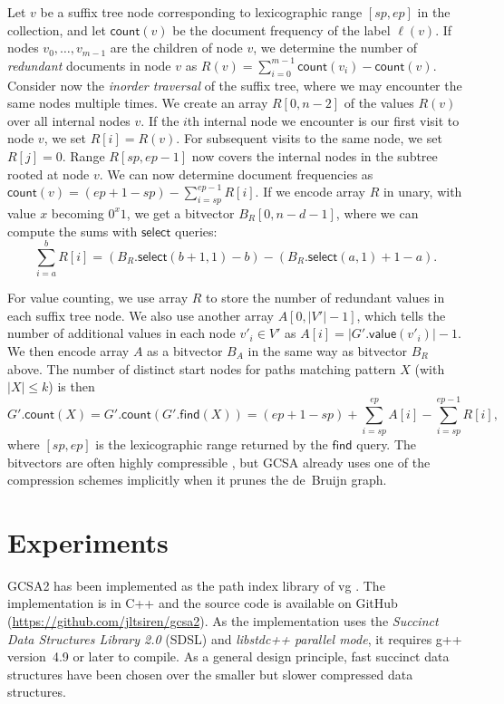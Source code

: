 \documentclass[a4paper,UKenglish]{lipics-v2016}
\newcommand{\abs}[1]{\ensuremath{\lvert #1 \rvert}}
\newcommand{\select}{\ensuremath{\mathsf{select}}}
\newcommand{\find}{\ensuremath{\mathsf{find}}}
\newcommand{\countq}{\ensuremath{\mathsf{count}}}
\newcommand{\gvalue}{\ensuremath{\mathsf{value}}}
\begin{document}
Let $v$ be a suffix tree node corresponding to lexicographic range $[sp, ep]$ in the collection, and let $\countq(v)$ be the document frequency of the label $\ell(v)$. If nodes $v_{0}, \dotsc, v_{m-1}$ are the children of node $v$, we determine the number of \emph{redundant} documents in node $v$ as $R(v) = \sum_{i=0}^{m-1} \countq(v_{i}) - \countq(v)$. Consider now the \emph{inorder traversal} of the suffix tree, where we may encounter the same nodes multiple times. We create an array $R[0, n-2]$ of the values $R(v)$ over all internal nodes $v$. If the $i$th internal node we encounter is our first visit to node $v$, we set $R[i] = R(v)$. For subsequent visits to the same node, we set $R[j] = 0$. Range $R[sp, ep-1]$ now covers the internal nodes in the subtree rooted at node $v$. We can now determine document frequencies as $\countq(v) = (ep+1-sp) - \sum_{i=sp}^{ep-1} R[i]$. If we encode array $R$ in unary, with value $x$ becoming $0^{x} 1$, we get a bitvector $B_{R}[0, n-d-1]$, where we can compute the sums with $\select$ queries:
$$
\sum_{i=a}^{b} R[i] = (B_{R}.\select(b+1, 1) - b) - (B_{R}.\select(a, 1) + 1 - a).
$$

For value counting, we use array $R$ to store the number of redundant values in each suffix tree node. We also use another array $A[0, \abs{V'}-1]$, which tells the number of additional values in each node $v'_{i} \in V'$ as $A[i] = \abs{G'.\gvalue(v'_{i})}-1$. We then encode array $A$ as a bitvector $B_{A}$ in the same way as bitvector $B_{R}$ above. The number of distinct start nodes for paths matching pattern $X$ (with $\abs{X} \le k$) is then
$$
G'.\countq(X) = G'.\countq(G'.\find(X)) = (ep+1-sp) + \sum_{i=sp}^{ep} A[i] - \sum_{i=sp}^{ep-1} R[i],
$$
where $[sp, ep]$ is the lexicographic range returned by the $\find$ query. The bitvectors are often highly compressible \cite{Gagie2015}, but GCSA already uses one of the compression schemes implicitly when it prunes the de~Bruijn graph.


\section{Experiments}

GCSA2 has been implemented as the path index library of vg \cite{Garrison2014-2016}. The implementation is in C++ and the source code is available on GitHub (\url{https://github.com/jltsiren/gcsa2}). As the implementation uses the \emph{Succinct Data Structures Library 2.0} (SDSL) \cite{Gog2014b} and \emph{libstdc++ parallel mode}, it requires g++ version~4.9 or later to compile. As a general design principle, fast succinct data structures have been chosen over the smaller but slower compressed data structures.
\end{document}
